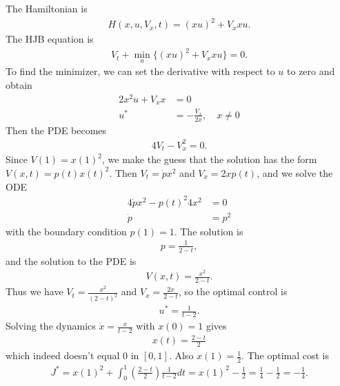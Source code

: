 \documentclass[12pt]{article}
\begin{document}
\begin{problem}[6]
The Hamiltonian is
\begin{align*}
	H(x,u,V_x,t) = (xu)^2 + V_x xu .
\end{align*}
The HJB equation is
\begin{align*}
	V_t + \min_u \{(xu)^2 + V_x xu\} =0.
\end{align*}
To find the minimizer, we can set the derivative with respect to $ u$ to zero and obtain
 \begin{align*}
	2x^2 u + V_x x &= 0 \\
	u^* &= - \frac{V_x}{ 2x} ,\quad  x \neq 0
\end{align*}
Then the PDE becomes
\begin{align*}
	4 V_t - V_x^2 =0 . 
\end{align*}
Since $ V(1) = x(1)^2$, we make the guess that the solution has the form $ V(x,t) = p(t) x(t)^2$. Then $ V_t = \dot{p} x^2$ and $ V_x = 2x p(t)$, and we solve the ODE
 \begin{align*}
	4\dot{p}x^2 - p(t)^2 4 x^2 &= 0 \\
	\dot{p} &= p^2 
\end{align*}
with the boundary condition $ p(1) = 1$. The solution is
 \begin{align*}
	p = \frac{1}{2-t} ,
\end{align*}
and the solution to the PDE is
\begin{align*}
	V(x,t) = \frac{x^2}{ 2-t} .
\end{align*}
Thus we have $ V_t = \frac{x^2}{ (2-t)^2}$ and $ V_x = \frac{2x}{ 2-t}$, so the optimal control is 
\begin{align*}
	u^*  = \frac{1}{t-2}.
\end{align*}
Solving the dynamics $ \dot{x} = \frac{x}{t-2}$ with $ x(0)=1$ gives
 \begin{align*}
	x(t) = \frac{2-t}{ 2}
\end{align*}
which indeed doesn't equal 0 in $ [0,1]$. Also $ x(1) = \frac{1}{2}$. The optimal cost is
 \begin{align*}
	J^*  = x(1)^2 + \int_{ 0}^{ 1} \left( \frac{2-t}{ 2} \right)  \frac{1}{t-2} dt = x(1)^2-\frac{1}{2} = \frac{1}{4} - \frac{1}{2} = -\frac{1}{4}.
\end{align*}
\end{problem}
\end{document}
